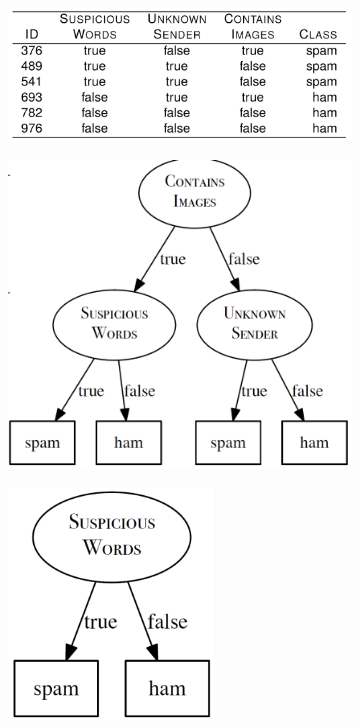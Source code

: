 \begin{figure}[h]
  \centering
  \begin{subfigure}{0.3\textwidth}
    \centering
    \includegraphics[width=\textwidth]{assets/trees/basics/part_example_data.png}
  \end{subfigure}
  \vspace*{10mm}
  \begin{subfigure}{0.3\textwidth}
    \centering
    \includegraphics[width=\textwidth]{assets/trees/basics/part_example_bad.png}
  \end{subfigure}
  \vspace*{10mm}
  \begin{subfigure}{0.25\textwidth}
    \centering
    \includegraphics[width=0.6\textwidth]{assets/trees/basics/part_example_good.png}

\end{subfigure}
\end{figure}

